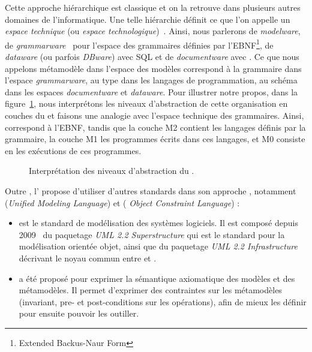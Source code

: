 Cette approche hiérarchique est classique et on la retrouve dans plusieurs
autres domaines de l'informatique. Une telle hiérarchie définit ce que l'on
appelle un \emph{espace technique} (ou \emph{espace
technologique})~\cite{KurtevBezAks2002, Bezivin2006}. Ainsi, nous parlerons de
\emph{modelware}, de \emph{grammarware}~\cite{Klint2005,grammarware} pour
l'espace des grammaires définies par l'EBNF\footnote{Extended Backus-Naur
Form}, de \emph{dataware} (ou parfois \emph{DBware}) avec SQL et de
\emph{documentware} avec {\xml}. Ce que nous appelons métamodèle dans l'espace
des modèles correspond à la grammaire dans l'espace \emph{grammarware}, au
type dans les langages de programmation, au
schéma dans les espaces \emph{documentware} et \emph{dataware}.
Pour illustrer notre propos, dans la figure~\ref{fig:mdalevelsinterpretation},
nous interprétons les niveaux d'abstraction de cette organisation en couches du
{\mda} et faisons une analogie avec l'espace technique des grammaires. Ainsi,
{\mof} correspond à l'EBNF, tandis que la couche M2 contient les langages
définis par la grammaire, la couche M1 les programmes écrits dans ces langages,
et M0 consiste en les exécutions de ces programmes.

\begin{figure}[h]%
  \begin{center}
    
    \caption{Interprétation des niveaux d'abstraction du {\mda}.}
    \label{fig:mdalevelsinterpretation}
  \end{center}
\end{figure}

Outre {\mof}, l'{\omg} propose d'utiliser d'autres standards dans son
approche {\mda}, notamment {\uml} (\emph{Unified Modeling Language}) et ({\ocl}
\emph{Object Constraint Language}) :
\begin{itemize}

  \item {\uml} est le standard de modélisation des systèmes logiciels. Il est
    composé depuis 2009~\cite{uml2} du paquetage \emph{UML 2.2 Superstructure}
    qui est le standard pour la modélisation orientée objet, ainsi que du
    paquetage \emph{UML 2.2 Infrastructure} décrivant le noyau commun entre
    {\mof} et {\uml}.

  \item {\ocl} a été proposé pour exprimer la sémantique axiomatique des modèles
    et des métamodèles. Il permet d'exprimer des contraintes sur les
    métamodèles (invariant, pre- et post-conditions sur les opérations), afin de
    mieux les définir pour ensuite pouvoir les outiller. 
\end{itemize}

